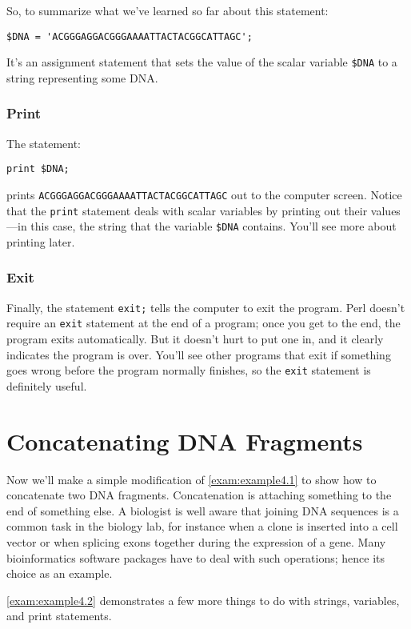 So, to summarize what we've learned so far about this statement:

\begin{lstlisting}
$DNA = 'ACGGGAGGACGGGAAAATTACTACGGCATTAGC';
\end{lstlisting}

It's an assignment statement that sets the value of the scalar variable \verb|$DNA| to a string representing some DNA. 

\subsubsection{Print}
The statement:

\begin{lstlisting}
print $DNA;
\end{lstlisting}

prints \verb|ACGGGAGGACGGGAAAATTACTACGGCATTAGC| out to the computer screen. Notice that the \verb|print| statement deals with scalar variables by printing out their values—in this case, the string that the variable \verb|$DNA| contains. You'll see more about printing later. 

\subsubsection{Exit}
Finally, the statement \verb|exit;| tells the computer to exit the program. Perl doesn't require an \verb|exit| statement at the end of a program; once you get to the end, the program exits automatically. But it doesn't hurt to put one in, and it clearly indicates the program is over. You'll see other programs that exit if something goes wrong before the program normally finishes, so the \verb|exit| statement is definitely useful. 

\section{Concatenating DNA Fragments}
Now we'll make a simple modification of \autoref{exam:example4.1} to show how to concatenate two DNA fragments. Concatenation is attaching something to the end of something else. A biologist is well aware that joining DNA sequences is a common task in the biology lab, for instance when a clone is inserted into a cell vector or when splicing exons together during the expression of a gene. Many bioinformatics software packages have to deal with such operations; hence its choice as an example.

\autoref{exam:example4.2} demonstrates a few more things to do with strings, variables, and print statements. 

